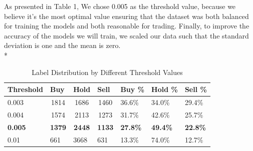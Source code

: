 \documentclass{article}
\begin{document}
As presented in Table 1, We chose 0.005 as the threshold value, because we believe it's the most optimal value ensuring that the dataset was both balanced for training the models and both reasonable for trading. Finally, to improve the accuracy of the models we will train, we scaled our data such that the standard deviation is one and the mean is zero.\vspace{0.1cm}\\*
\begin{table}[H]
\centering
    \caption{Label Distribution by Different Threshold Values}
\begin{tabular}{|l|c|c|c|l|l|l|}
\hline
Threshold & \multicolumn{1}{l|}{Buy} & \multicolumn{1}{l|}{Hold} & \multicolumn{1}{l|}{Sell} & Buy \% & Hold \% & Sell \% \\ \hline
0.003     & 1814                     & 1686                      & 1460                      & 36.6\% & 34.0\%  & 29.4\%  \\ \hline
0.004     & 1574                     & 2113                      & 1273                      & 31.7\% & 42.6\%  & 25.7\%  \\ \hline
\textbf{0.005} & \textbf{1379}       & \textbf{2448}             & \textbf{1133}             & \textbf{27.8\%}  & \textbf{49.4\%} & \textbf{22.8\%} \\ \hline
0.01      & \multicolumn{1}{l|}{661} & \multicolumn{1}{l|}{3668} & \multicolumn{1}{l|}{631}  & 13.3\% & 74.0\%  & 12.7\%  \\ \hline
\end{tabular}
\end{table}
\end{document}
